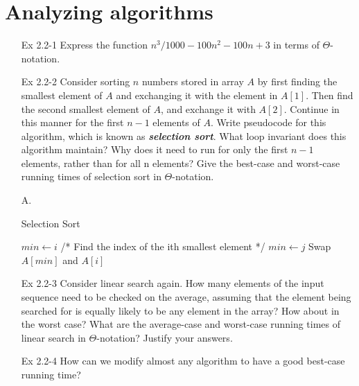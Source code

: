 \documentclass[fontsize=12pt,paper=a4]{book}
\newcommand{\To}{\ \textbf{to}\ }
\newcommand{\Lcomment}[1]{\Statex /* #1 */}
\begin{document}
\section{Analyzing algorithms}
\begin{enumerate}
	\item[Ex 2.2-1]
		Express the function $n^3/1000 - 100n^2 -100n + 3$ in terms of $\Theta$-notation.

	\item[Ex 2.2-2]
		Consider sorting $n$ numbers stored in array $A$ by first finding the smallest element of $A$ and exchanging it with the element in $A[1]$. Then find the second smallest element of $A$, and exchange it with $A[2]$. Continue in this manner for the first $n-1$ elements of $A$. Write pseudocode for this algorithm, which is known as \textbf{\textit{selection sort}}. What loop invariant does this algorithm maintain? Why does it need to run for only the first $n-1$ elements, rather than for all n elements? Give the best-case and worst-case running times of selection sort in $\Theta$-notation.
	\item[A.]
		\begin{algorithm}
			\caption{Selection Sort}
			\begin{algorithmic}[1]
				\For{$i \gets 0 \To n-1$}
					\State $min \gets i$
					\For{$j \gets i+1 \To n$}
						\Lcomment{Find the index of the ith smallest element}
							\State $min \gets j$
						\EndIf
					\EndFor
				\EndFor
				\State Swap $A[min]$ and $A[i]$
				\EndProcedure
			\end{algorithmic}
		\end{algorithm}
		
	\item[Ex 2.2-3]
		Consider linear search again. How many elements of the input sequence need to be checked on the average, assuming that the element being searched for is equally likely to be any element in the array? How about in the worst case? What are the average-case and worst-case running times of linear search in $\Theta$-notation? Justify your answers.
		
	\item[Ex 2.2-4]
		How can we modify almost any algorithm to have a good best-case running time?
		
\end{enumerate}
\end{document}
